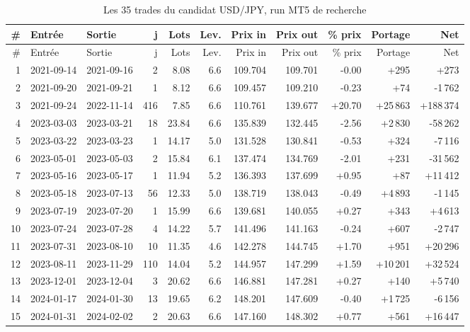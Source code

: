 \begin{longtable}{@{}rllrrrrrrrr@{}}
\caption{Les 35 trades du candidat USD/JPY, run MT5 de recherche}\\
\toprule
\# & Entrée & Sortie & j & Lots & Lev. & Prix in & Prix out & \% prix & Portage & Net \\
\midrule
\endfirsthead
\toprule
\# & Entrée & Sortie & j & Lots & Lev. & Prix in & Prix out & \% prix & Portage & Net \\
\midrule
\endhead
1 & 2021-09-14 & 2021-09-16 & 2 & 8.08 & 6.6 & 109.704 & 109.701 & -0.00 & +295 & +273 \\
2 & 2021-09-20 & 2021-09-21 & 1 & 8.12 & 6.6 & 109.457 & 109.210 & -0.23 & +74 & -1\,762 \\
3 & 2021-09-24 & 2022-11-14 & 416 & 7.85 & 6.6 & 110.761 & 139.677 & +20.70 & +25\,863 & +188\,374 \\
4 & 2023-03-03 & 2023-03-21 & 18 & 23.84 & 6.6 & 135.839 & 132.445 & -2.56 & +2\,830 & -58\,262 \\
5 & 2023-03-22 & 2023-03-23 & 1 & 14.17 & 5.0 & 131.528 & 130.841 & -0.53 & +324 & -7\,116 \\
6 & 2023-05-01 & 2023-05-03 & 2 & 15.84 & 6.1 & 137.474 & 134.769 & -2.01 & +231 & -31\,562 \\
7 & 2023-05-16 & 2023-05-17 & 1 & 11.94 & 5.2 & 136.393 & 137.699 & +0.95 & +87 & +11\,412 \\
8 & 2023-05-18 & 2023-07-13 & 56 & 12.33 & 5.0 & 138.719 & 138.043 & -0.49 & +4\,893 & -1\,145 \\
9 & 2023-07-19 & 2023-07-20 & 1 & 15.99 & 6.6 & 139.681 & 140.055 & +0.27 & +343 & +4\,613 \\
10 & 2023-07-24 & 2023-07-28 & 4 & 14.22 & 5.7 & 141.496 & 141.163 & -0.24 & +607 & -2\,747 \\
11 & 2023-07-31 & 2023-08-10 & 10 & 11.35 & 4.6 & 142.278 & 144.745 & +1.70 & +951 & +20\,296 \\
12 & 2023-08-11 & 2023-11-29 & 110 & 14.04 & 5.2 & 144.957 & 147.299 & +1.59 & +10\,201 & +32\,524 \\
13 & 2023-12-01 & 2023-12-04 & 3 & 20.62 & 6.6 & 146.881 & 147.281 & +0.27 & +140 & +5\,740 \\
14 & 2024-01-17 & 2024-01-30 & 13 & 19.65 & 6.2 & 148.201 & 147.609 & -0.40 & +1\,725 & -6\,156 \\
15 & 2024-01-31 & 2024-02-02 & 2 & 20.63 & 6.6 & 147.160 & 148.302 & +0.77 & +561 & +16\,447 \\

\end{longtable}
